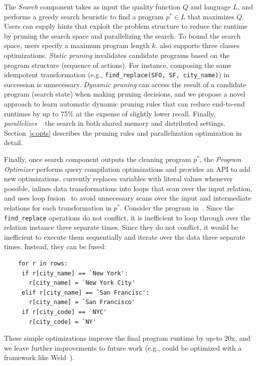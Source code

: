 The {\it Search} component takes as input the quality function $Q$ and language $L$, and performs a greedy search heuristic to find a program $p^* \in L$ that maximizes $Q$.  Users can supply hints that exploit the problem structure to reduce the runtime by pruning the search space and parallelizing the search.  To bound the search space, users specify a maximum program length $k$.    \sys also supports three classes optimizations. {\it Static pruning} invalidates candidate programs based on the program structure (sequence of actions).  For instance, composing the same idempotent transformation (e.g., \texttt{find\_replace(SFO, SF, city\_name)}) in succession is unnecessary.  {\it Dynamic pruning} can access the result of a candidate program (search state) when making pruning decisions, and we propose a novel approach to learn automatic dynamic pruning rules that can reduce end-to-end runtimes by up to 75\% at the expense of slightly lower recall. Finally, \sys ~ {\it parallelizes} ~ the search in both shared memory and distributed settings.  Section~\ref{s:opts} describes the pruning rules and parallelization optimization in detail.


Finally, once search component outputs the cleaning program $p^*$, the {\it Program Optimizer} performs query compilation optimizations and provides an API to add new optimizations.  \sys currently replaces variables with literal values whenever possible, inlines data transformations into loops that scan over the input relation, and uses loop fusion~\cite{palkar2017weld, crotty2014tupleware} to avoid unnecessary scans over the input and intermediate relations for each transformation in $p^*$.  Consider the program in~.  Since the \texttt{find\_replace} operations do not conflict, it is inefficient to loop through over the relation instance three separate times.  Since they do not conflict, it would be inefficient to execute them sequentially and iterate over the data three separate times.  Instead, they can be fused:
{\small
\begin{lstlisting}
    for r in rows:
     if r[city_name] == `New York':
       r[city_name] = `New York City'
     elif r[city_name] == `San Francisc':
       r[city_name] = `San Francisco'
     if r[city_code] == `NYC'
       r[city_code] = `NY'
\end{lstlisting}
}
These simple optimizations improve the final program runtime by up-to 20x, and we leave further improvements to future work (e.g., could be optimized with a framework like Weld~\cite{palkar2017weld}).


